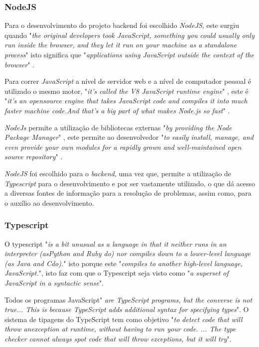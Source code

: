 \subsubsection{NodeJS}

Para o desenvolvimento do projeto backend foi escolhido \textit{NodeJS}, este surgiu quando "\emph{the original developers took JavaScript, something you could usually only run inside the browser, and they let it run on your machine as a standalone process}"\citep{design_node} isto significa que "\emph{applications using JavaScript outside the context of the browser}"\citep{design_node} .

Para correr \textit{JavaScript} a nível de servidor web e a nível de computador pessoal é utilizado o mesmo motor, "\emph{it's called the V8 JavaScript runtime engine}"\citep{design_node} , este é "\emph{it's an opensource engine that takes JavaScript code and compiles it into much faster machine code.And that's a big part of what makes Node.js so fast}"\citep{design_node} .

\textit{NodeJs} permite a utilização de bibliotecas externas "\emph{by providing the Node Package Manager}"\citep{design_node} , este permite ao desenvolvedor "\emph{to easily install, manage, and even provide  your own modules for a rapidly grown and well-maintained open source repository}"\citep{design_node} .

\textit{NodeJS} foi escolhido para o \textit{backend}, uma vez que, permite a utilização de \textit{Typescript} para o desenvolvimento e por ser vastamente utilizado, o que dá acesso a diversas fontes de informação para a resolução de problemas, assim como, para o auxílio ao desenvolvimento.

\newpage

\subsubsection{Typescript}
O typescript "\emph{is  a  bit  unusual  as  a  language  in  that  it  neither  runs  in  an  interpreter  (asPython  and  Ruby  do)  nor  compiles  down  to  a  lower-level  language  (as  Java  and  Cdo).}"\citep{typescript} isto porque este "\emph{compiles  to  another  high-level  language,  JavaScript.}"\citep{typescript}, isto faz com que o Typescript seja visto como "\emph{a  superset  of  JavaScript  in  a  syntactic  sense}"\citep{typescript}.

Todos os programas JavaScript" \emph{are  TypeScript  programs,  but  the  converse  is  not  true... This  is  because  TypeScript adds additional syntax for specifying types}". O sistema de tipagens do TypeScript tem como objetivo "\emph{to  detect  code  that  will  throw  anexception  at  runtime,  without  having  to  run  your  code. ... The  type  checker  cannot always spot code that will throw exceptions, but it will try}"\citep{typescript}.

